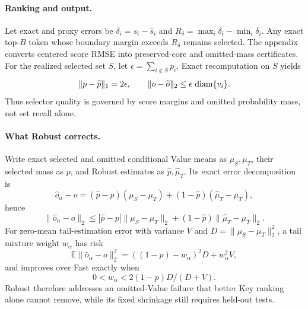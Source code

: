 \paragraph{Ranking and output.}
Let exact and proxy errors be $\delta_i=s_i-\widehat s_i$ and
$R_\delta=\max_i\delta_i-\min_i\delta_i$.  Any exact top-$B$ token whose
boundary margin exceeds $R_\delta$ remains selected.  The appendix converts
centered score RMSE into preserved-core and omitted-mass certificates.  For
the realized selected set $S$, let
$\epsilon=\sum_{i\notin S}p_i$.  Exact recomputation on $S$ yields
\begin{equation}
 \|p-\widetilde p\|_1=2\epsilon,\qquad
 \|o-\widetilde o\|_2
 \le\epsilon\,\operatorname{diam}\{v_i\}.
 \label{eq:main-output-bound}
\end{equation}
Thus selector quality is governed by score margins and omitted probability
mass, not set recall alone.

\paragraph{What Robust corrects.}
Write exact selected and omitted conditional Value means as $\mu_S,\mu_T$,
their selected mass as $p$, and Robust estimates as
$\widehat p,\widehat\mu_T$.  Its exact error decomposition is
\begin{equation}
 \widehat o_\alpha-o=(\widehat p-p)(\mu_S-\mu_T)
 +(1-\widehat p)(\widehat\mu_T-\mu_T),
 \label{eq:tail-error-decomposition}
\end{equation}
hence
\begin{equation}
 \|\widehat o_\alpha-o\|_2\le
 |\widehat p-p|\|\mu_S-\mu_T\|_2
 +(1-\widehat p)\|\widehat\mu_T-\mu_T\|_2.
 \label{eq:tail-error-bound}
\end{equation}
For zero-mean tail-estimation error with variance $V$ and
$D=\|\mu_S-\mu_T\|_2^2$, a tail mixture weight $w_\alpha$ has risk
\begin{equation}
 \mathbb E\|\widehat o_\alpha-o\|_2^2
 =((1-p)-w_\alpha)^2D+w_\alpha^2V,
 \label{eq:tail-bias-variance}
\end{equation}
and improves over Fast exactly when
\begin{equation}
 0<w_\alpha<2(1-p)D/(D+V).
 \label{eq:tail-correction-benefit}
\end{equation}
Robust therefore addresses an omitted-Value failure that better Key ranking
alone cannot remove, while its fixed shrinkage still requires held-out tests.

